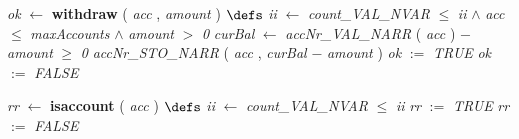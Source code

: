 \begin{tabbing}
\bSetTabs
\+\>
%
%
{\em ok\/} $\longleftarrow$  {\bf { withdraw}} ( {\em acc\/} , {\em amount\/} ) \bhsp $\defs$ \+ \bnl
  \+\bnl
{}  \- \bhsp {} \+\bnl
{\em ii\/} $\longleftarrow$ {\em count\_VAL\_NVAR\/}\label{count_VAL_NVAR}  \bStatementSemiColon \bnl
{}  $\leq$ {\em ii\/} $\wedge$
{\em acc\/} $\leq$ {\em maxAccounts\/}\label{maxAccounts}  $\wedge$
{\em amount\/} $>$ {\em 0\/} \- \bhsp {} \+\bnl
{}  \- \bhsp {} \+\bnl
{\em curBal\/} $\longleftarrow$ {\em accNr\_VAL\_NARR\/}\label{accNr_VAL_NARR}  ( {\em acc\/} )  \bStatementSemiColon \bnl
{}  $-$ {\em amount\/} $\geq$ {\em 0\/} \- \bhsp {} \+\bnl
{\em accNr\_STO\_NARR\/}\label{accNr_STO_NARR}  ( {\em acc\/} , {\em curBal\/} $-$ {\em amount\/} )  \bStatementSemiColon \bnl
{\em ok\/} $:=$  {\em TRUE\/} \-\bnl
{}  \-\bnl
{}  \-\bnl
{} \+\bnl
{\em ok\/} $:=$  {\em FALSE\/} \-\bnl
{}  \-\bnl
{}  \-\bnl
{}  \- \bOperationSemiColon 
\end{tabbing}
\bresetindent
%
%
\vspace{-4.5ex}\bsetindent
\begin{tabbing}
\bSetTabs
\+\>
%
%
{\em rr\/} $\longleftarrow$  {\bf { isaccount}} ( {\em acc\/} ) \bhsp $\defs$ \+ \bnl
  \+\bnl
{}  \- \bhsp {} \+\bnl
{\em ii\/} $\longleftarrow$ {\em count\_VAL\_NVAR\/}\label{count_VAL_NVAR}  \bStatementSemiColon \bnl
{}  $\leq$ {\em ii\/} \- \bhsp {} \+\bnl
{\em rr\/} $:=$  {\em TRUE\/} \-\bnl
{} \+\bnl
{\em rr\/} $:=$  {\em FALSE\/} \-\bnl
{}  \-\bnl
{}  \-\bnl
{}  \- \bOperationSemiColon 
\end{tabbing}
